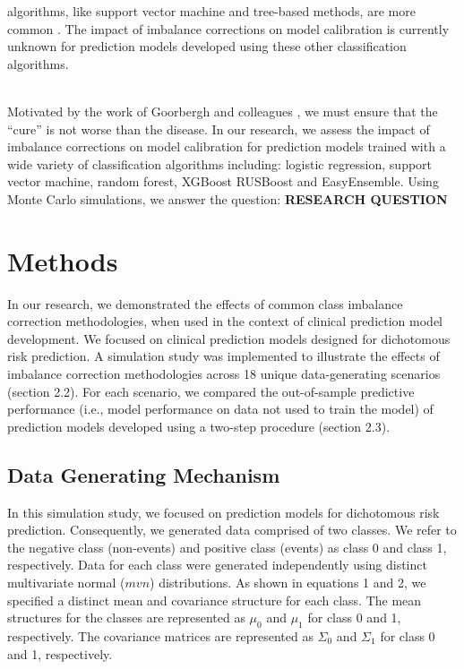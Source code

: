 \documentclass[AMA,STIX1COL,]{WileyNJD-v2}
\begin{document}
algorithms, like support vector machine and tree-based methods, are more
common \citep{constanza}. The impact of imbalance corrections on model
calibration is currently unknown for prediction models developed using
these other classification algorithms.\\
\strut \\
Motivated by the work of Goorbergh and colleagues \citep{ruben}, we must
ensure that the ``cure'' is not worse than the disease. In our research,
we assess the impact of imbalance corrections on model calibration for
prediction models trained with a wide variety of classification
algorithms including: logistic regression, support vector machine,
random forest, XGBoost RUSBoost and EasyEnsemble. Using Monte Carlo
simulations, we answer the question: \textbf{RESEARCH QUESTION}

\hypertarget{methods}{%
\section{Methods}\label{methods}}

In our research, we demonstrated the effects of common class imbalance
correction methodologies, when used in the context of clinical
prediction model development. We focused on clinical prediction models
designed for dichotomous risk prediction. A simulation study was
implemented to illustrate the effects of imbalance correction
methodologies across 18 unique data-generating scenarios (section 2.2).
For each scenario, we compared the out-of-sample predictive performance
(i.e., model performance on data not used to train the model) of
prediction models developed using a two-step procedure (section 2.3).

\hypertarget{data-generating-mechanism}{%
\subsection{Data Generating Mechanism}\label{data-generating-mechanism}}

In this simulation study, we focused on prediction models for
dichotomous risk prediction. Consequently, we generated data comprised
of two classes. We refer to the negative class (non-events) and positive
class (events) as class 0 and class 1, respectively. Data for each class
were generated independently using distinct multivariate normal
(\(mvn\)) distributions. As shown in equations 1 and 2, we specified a
distinct mean and covariance structure for each class. The mean
structures for the classes are represented as \(\mu_0\) and \(\mu_1\)
for class 0 and 1, respectively. The covariance matrices are represented
as \(\Sigma_0\) and \(\Sigma_1\) for class 0 and 1, respectively.
\end{document}
